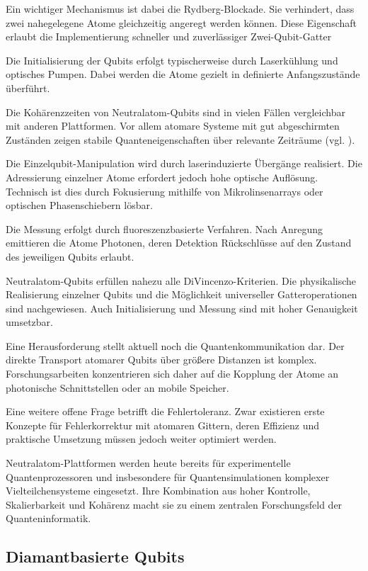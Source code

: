 Ein wichtiger Mechanismus ist dabei die Rydberg-Blockade. Sie verhindert, dass zwei nahegelegene Atome gleichzeitig angeregt werden können. Diese Eigenschaft erlaubt die Implementierung schneller und zuverlässiger Zwei-Qubit-Gatter

Die Initialisierung der Qubits erfolgt typischerweise durch Laserkühlung und optisches Pumpen. Dabei werden die Atome gezielt in definierte Anfangszustände überführt.

Die Kohärenzzeiten von Neutralatom-Qubits sind in vielen Fällen vergleichbar mit anderen Plattformen. Vor allem atomare Systeme mit gut abgeschirmten Zuständen zeigen stabile Quanteneigenschaften über relevante Zeiträume (vgl. \cite{saffman_quantum_nodate}).

Die Einzelqubit-Manipulation wird durch laserinduzierte Übergänge realisiert. Die Adressierung einzelner Atome erfordert jedoch hohe optische Auflösung. Technisch ist dies durch Fokusierung mithilfe von Mikrolinsenarrays oder optischen Phasenschiebern lösbar.

Die Messung erfolgt durch fluoreszenzbasierte Verfahren. Nach Anregung emittieren die Atome Photonen, deren Detektion Rückschlüsse auf den Zustand des jeweiligen Qubits erlaubt.

Neutralatom-Qubits erfüllen nahezu alle DiVincenzo-Kriterien. Die physikalische Realisierung einzelner Qubits und die Möglichkeit universeller Gatteroperationen sind nachgewiesen. Auch Initialisierung und Messung sind mit hoher Genauigkeit umsetzbar.

Eine Herausforderung stellt aktuell noch die Quantenkommunikation dar. Der direkte Transport atomarer Qubits über größere Distanzen ist komplex. Forschungsarbeiten konzentrieren sich daher auf die Kopplung der Atome an photonische Schnittstellen oder an mobile Speicher.

Eine weitere offene Frage betrifft die Fehlertoleranz. Zwar existieren erste Konzepte für Fehlerkorrektur mit atomaren Gittern, deren Effizienz und praktische Umsetzung müssen jedoch weiter optimiert werden.

Neutralatom-Plattformen werden heute bereits für experimentelle Quantenprozessoren und insbesondere für Quantensimulationen komplexer Vielteilchensysteme eingesetzt. Ihre Kombination aus hoher Kontrolle, Skalierbarkeit und Kohärenz macht sie zu einem zentralen Forschungsfeld der Quanteninformatik.



\subsection{Diamantbasierte Qubits}
\label{subsec: Diamantbasierte Qubits}

